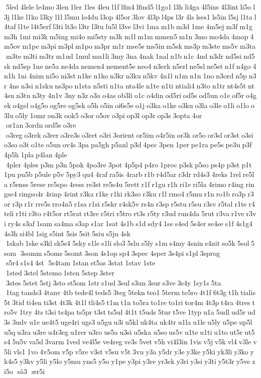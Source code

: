  5led 4lele le4mo 3len 1ler 1les 4leu l1f lfin4 lfind5 l1go1 l3h li4ga 4l5ins 4l3int li5o l3j l1ke l1ko l3ky l1l l5mu lo4du l3op 4l5or 3lov 4l3p l4ps l3r 4ls lses1 ls5in l5sj l1ta l4taf l1te l4t5erf l3ti lt3o l3tr l3tu lu5l l3ve l3vi 1ma m1b m3d 1me 4m5ej m3f m1g m3h 1mi mi3k m5ing mi4o mi5sty m3k m1l m1m mmen5 m1n 3mo mo4da 4mop 4m5ov m1pe m3pi m3pl m1po m3pr m1r mse5s ms5in m5sk ms3p m3ste ms5v m3ta m3te m3ti m3tr m1ud 1mul mu1li 3my 3na 4nak 1nal n1b n1c 4nd n3dr nd5si nd5sk nd5sp 1ne ne5a ne4da nemen4 nement5e neo4 n3erk n5erl ne5sl ne5st n1f n4go 4n1h 1ni 4nim ni5o ni3st n1ke n1ko n3kr n3ku n5kv 4n1l n1m n1n 1no n3ord n5p n3r 4ns n3si n1sku ns3po n1sta n5sti n1ta nta4le n1te n1ti ntiali4 n3to n1tr nt4s5t nt4su n3tu n3ty 4n1v 3ny n3z o3a o4as ob3li o1c o4din od5ri od5s od5un o1e of5r o4gek o4gel o4g5o og5re og5sk o5h o5in oi6s5e o1j o3ka o1ke o3ku o3la o3le o1li o1lo o3lu o5ly 1omr on3k ook5 o3or o5ov o3pi op3l op3r op3s 3opta 4or  or1an 3ordn ord5s o3re  o3reg o3rek o3rer o3re3s o3ret o3ri 3orient or5im o4r5in or3k or5o or3sl or3st o3si o3so o3t o1te o5un ov4s 3pa pa5gh p5anl p3d 4pec 3pen 1per pe1ra pe5s pe3u p3f 4p5h 1pla p4lan 4ple  4pler 4ples p3m p3n 5pok 4po3re 3pot 4p5p4 p4ro 1proc p3sk p5so ps4p p3st p1t 1pu pu5b p5ule p5v 5py3 qu4 4raf ra5is 4rarb r1b r4d5ar r3dr rd4s3 4reks 1rel re5la r5enss 5rese re5spo 4ress re3st re5s4u 5rett r1f r1gu r1h ri1e ri5la 4rimo r4ing ringse4 ringso4r 4rinp 4rint r3ka r1ke r1ki rk3so r3ku r1l rmo4 r5mu r1n ro1b ro3p r3or r3p r1r rre5s rro4n5 r1sa r1si r5skr r4sk5v rs4n r3sp r5stu r5su r3sv r5tal r1te r4teli r1ti r3to r4t5or rt5rat rt3re r5tri r5tro rt3s r5ty r3ud run4da 5rut r3va r1ve r3vi ry4s s3af 1sam sa4ma s3ap s1ar 1sat 4s1b s1d sdy4 1se s4ed 5s4er se4se s1f 4s1g4 4s3h si4bl 1sig s5int 5sis 5sit 5siu s5ju 4sk  1skab 1ske s3kl sk5s4 5sky s1le s1li slo3 5slu s5ly s1m s4my 4snin s4nit so5k 5sol 5som  3somm s5oms 5somt 3son 4s1op sp4 3spec 4sper 3s4pi s1pl 3sprog  s5r4 s1s4 4st  5s4tam 1stan st5as 3stat 1stav 1ste  1sted 3stel 5stemo 1sten 5step 3ster  3stes 5stet 5stj 3sto st5om 1str s1ud 3sul s3un 3sur s3ve 3s4y 1sy1s 5ta  1tag tands3 4tanv 4tb tede4l teds5 3teg 5tekn teo1 5term te5ro 4t1f 6t3g t1h tialis5t 3tid ti4en ti3st 4t3k 4t1l tli4s5 t1m t1n to5ra to1re to1ri tor4m 4t3p t4ra 4tres tro5v 1try 4ts t3si ts4pa ts5pr t3st ts5ul 4t1t t5uds 5tur t5ve 1typ u1a 5udl ud5r ud3s 3udv u1e ue4t5 uge4ri ugs3 u5gu u3i u5kl uk4ta uk4tr u1la u1le u5ly u5pe up5l u5q u3ra u3re u4r3eg u1rer u3ro us5a u3si u5ska u5so us5v u1te u1ti u1to ut5r ut5s4 5u5v va5d 3varm 1ved ve4l5e ve4reg ve3s 5vet v5h vi4l3in 1vis v5j v5k vl4 v3le v5li vls1 1vo 4v5om v5p v5re v3st v5su v5t 3vu y3a y5dr y3e y3ke y5ki yk3li y3ko yk4s5 y3kv y5li y5lo y5mu yns5 y5o y1pe y3pi y3re yr3ek y3ri y3si y3ti y5t3r y5ve zi5o  så3  ær5i  